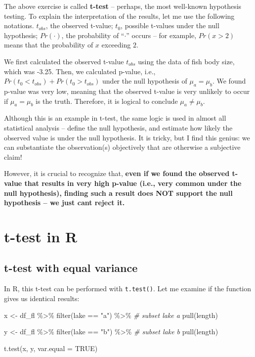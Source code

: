 \documentclass[
]{book}
\newenvironment{Shaded}{\begin{snugshade}}{\end{snugshade}}
\newcommand{\AttributeTok}[1]{\textcolor[rgb]{0.77,0.63,0.00}{#1}}
\newcommand{\CommentTok}[1]{\textcolor[rgb]{0.56,0.35,0.01}{\textit{#1}}}
\newcommand{\ConstantTok}[1]{\textcolor[rgb]{0.00,0.00,0.00}{#1}}
\newcommand{\FunctionTok}[1]{\textcolor[rgb]{0.00,0.00,0.00}{#1}}
\newcommand{\NormalTok}[1]{#1}
\newcommand{\OtherTok}[1]{\textcolor[rgb]{0.56,0.35,0.01}{#1}}
\newcommand{\SpecialCharTok}[1]{\textcolor[rgb]{0.00,0.00,0.00}{#1}}
\newcommand{\StringTok}[1]{\textcolor[rgb]{0.31,0.60,0.02}{#1}}
\begin{document}
The above exercise is called \textbf{t-test} -- perhaps, the most well-known hypothesis testing. To explain the interpretation of the results, let me use the following notations. \(t_{obs}\), the observed t-value; \(t_0\), possible t-values under the null hypothesis; \(Pr(\cdot)\), the probability of ``\(\cdot\)'' occurs -- for example, \(Pr(x > 2)\) means that the probability of \(x\) exceeding \(2\).

We first calculated the observed t-value \(t_{obs}\) using the data of fish body size, which was -3.25. Then, we calculated p-value, i.e., \(Pr(t_0 < t_{obs}) + Pr(t_0 > t_{obs})\) under the null hypothesis of \(\mu_a = \mu_b\). We found p-value was very low, meaning that the observed t-value is very unlikely to occur if \(\mu_a = \mu_b\) is the truth. Therefore, it is logical to conclude \(\mu_a \ne \mu_b\).

Although this is an example in t-test, the same logic is used in almost all statistical analysis -- define the null hypothesis, and estimate how likely the observed value is under the null hypothesis. It is tricky, but I find this genius: we can substantiate the observation(s) objectively that are otherwise a subjective claim!

However, it is crucial to recognize that, \textbf{even if we found the observed t-value that results in very high p-value (i.e., very common under the null hypothesis), finding such a result does NOT support the null hypothesis -- we just cant reject it.}

\hypertarget{t-test-in-r}{%
\section{t-test in R}\label{t-test-in-r}}

\hypertarget{t-test-with-equal-variance}{%
\subsection{t-test with equal variance}\label{t-test-with-equal-variance}}

In R, this t-test can be performed with \texttt{t.test()}. Let me examine if the function gives us identical results:

\begin{Shaded}
\begin{Highlighting}[]
\NormalTok{x }\OtherTok{\textless{}{-}}\NormalTok{ df\_fl }\SpecialCharTok{\%\textgreater{}\%}
  \FunctionTok{filter}\NormalTok{(lake }\SpecialCharTok{==} \StringTok{"a"}\NormalTok{) }\SpecialCharTok{\%\textgreater{}\%}  \CommentTok{\# subset lake a}
  \FunctionTok{pull}\NormalTok{(length)}

\NormalTok{y }\OtherTok{\textless{}{-}}\NormalTok{ df\_fl }\SpecialCharTok{\%\textgreater{}\%}
  \FunctionTok{filter}\NormalTok{(lake }\SpecialCharTok{==} \StringTok{"b"}\NormalTok{) }\SpecialCharTok{\%\textgreater{}\%} \CommentTok{\# subset lake b}
  \FunctionTok{pull}\NormalTok{(length)}

\FunctionTok{t.test}\NormalTok{(x, y, }\AttributeTok{var.equal =} \ConstantTok{TRUE}\NormalTok{)}
\end{Highlighting}
\end{Shaded}
\end{document}

